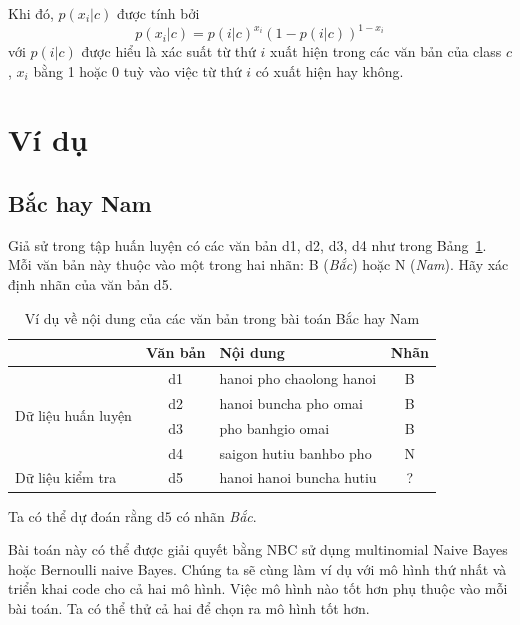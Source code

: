 Khi đó, $p(x_i | c) $ được tính bởi
\begin{equation}
p(x_i | c) = p(i | c)^{x_i}(1 - p(i | c) )^{1 - x_i}
\end{equation}
với $p(i | c)$ được hiểu là xác suất từ thứ $i$ xuất hiện trong các văn
bản của class $c$, $x_i$ bằng 1 hoặc 0 tuỳ vào việc từ thứ $i$ có xuất hiện hay không.



\section{Ví dụ }


\subsection{Bắc hay Nam }
Giả sử trong tập huấn luyện có các văn bản d1, d2, d3, d4 như trong Bảng~\ref{tab:32_1}. Mỗi văn bản này thuộc vào một trong hai nhãn: B (\textit{Bắc}) hoặc N (\textit{Nam}). Hãy xác định nhãn của văn bản d5.

\begin{table}[]
\centering
\caption{Ví dụ về nội dung của các văn bản trong bài toán Bắc hay Nam}
\label{tab:32_1}
\begin{tabular}{|l|c|l|c|}
\hline
& \textbf{Văn bản} & \textbf{Nội dung} & \textbf{Nhãn} \\ \hline \hline
\multirow{4}{*}{Dữ liệu huấn luyện} & d1     & hanoi pho chaolong hanoi         & B   \\ \cline{2-4}
& d2      & hanoi buncha pho omai         & B   \\ \cline{2-4}
& d3      & pho banhgio omai         & B   \\ \cline{2-4}
& d4      & saigon hutiu banhbo pho         & N   \\ \hline
Dữ liệu kiểm tra                        & d5      & hanoi hanoi buncha hutiu         & ?   \\ \hline
\end{tabular}
\end{table}

Ta có thể dự đoán rằng $\text{d5}$ có nhãn \textit{Bắc}.

Bài toán này có thể được giải quyết bằng NBC sử dụng multinomial Naive Bayes
hoặc Bernoulli naive Bayes. Chúng ta sẽ cùng làm ví dụ với mô hình thứ nhất và
triển khai code cho cả hai mô hình. Việc mô hình nào tốt hơn phụ thuộc vào mỗi
bài toán. Ta có thể thử cả hai để chọn ra mô hình tốt hơn.

